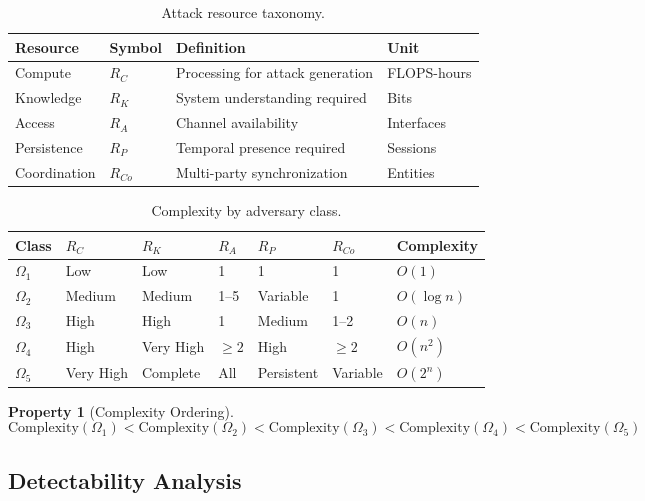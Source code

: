 \documentclass[
]{article}
\newtheorem{property}{Property}[section]
\begin{document}
\begin{table}[htbp]
\centering
\caption{Attack resource taxonomy.}
\label{tab:resource-types}
\begin{tabular}{@{}llp{4.5cm}l@{}}
\toprule
Resource & Symbol & Definition & Unit \\
\midrule
Compute & $R_C$ & Processing for attack generation & FLOPS-hours \\
Knowledge & $R_K$ & System understanding required & Bits \\
Access & $R_A$ & Channel availability & Interfaces \\
Persistence & $R_P$ & Temporal presence required & Sessions \\
Coordination & $R_{Co}$ & Multi-party synchronization & Entities \\
\bottomrule
\end{tabular}
\end{table}

\begin{table}[htbp]
\centering
\caption{Complexity by adversary class.}
\label{tab:complexity-by-class}
\begin{tabular}{@{}lllllll@{}}
\toprule
Class & $R_C$ & $R_K$ & $R_A$ & $R_P$ & $R_{Co}$ & Complexity \\
\midrule
$\Omega_1$ & Low & Low & 1 & 1 & 1 & $O(1)$ \\
$\Omega_2$ & Medium & Medium & 1--5 & Variable & 1 & $O(\log n)$ \\
$\Omega_3$ & High & High & 1 & Medium & 1--2 & $O(n)$ \\
$\Omega_4$ & High & Very High & $\geq 2$ & High & $\geq 2$ & $O(n^2)$ \\
$\Omega_5$ & Very High & Complete & All & Persistent & Variable & $O(2^n)$ \\
\bottomrule
\end{tabular}
\end{table}

\begin{property}[Complexity Ordering]
\label{prop:complexity-order}
\begin{equation}
\label{eq:complexity-order}
\text{Complexity}(\Omega_1) < \text{Complexity}(\Omega_2) < \text{Complexity}(\Omega_3) < \text{Complexity}(\Omega_4) < \text{Complexity}(\Omega_5)
\end{equation}
\end{property}

\subsection{Detectability Analysis}\label{sec:detectability}
\end{document}
